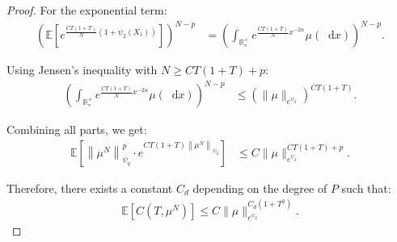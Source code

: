 \documentclass[11pt,a4paper]{article}
\newcommand{\RR}{\mathbb{R}}
\newcommand{\RRP}{\mathbb{R}^+_*}
\newcommand{\red}[1]{\textcolor{red}{#1}}
\newcommand{\E}[1]{\mathbb{E}\left[#1\right]}
\newcommand{\dd}{\mathop{}\!\mathrm{d}}
\newtheorem{lemma}[theorem]{Lemma}
\begin{document}
\begin{proof}
    For the exponential term:
    \begin{align*}
        \left(\E{e^{\frac{C T(1 + T)}{N}(1 + \psi_2(X_1))}}\right)^{N-p} 
        &= \left(\int_{\RRP} e^{\frac{C T(1 + T)}{N} x^{-2\alpha}} \mu(\dd x) \right)^{N - p}.
    \end{align*}

    Using Jensen’s inequality with $N \geq C T(1 + T) + p$:
    \begin{align*}
        \left(\int_{\RRP} e^{\frac{C T(1 + T)}{N} x^{-2\alpha}} \mu(\dd x)\right)^{N - p} 
        &\leq \left(\|\mu\|_{e^{\psi_2}}\right)^{C T(1 + T)}.
    \end{align*}

    Combining all parts, we get:
    \begin{align*}
        \E{\left\|\mu^N\right\|_{\psi_q}^p \cdot e^{C T(1 + T)\left\|\mu^N\right\|_{\psi_2}}} 
        &\leq C \|\mu\|_{e^{\psi_2}}^{C T(1 + T) + p}.
    \end{align*}

    Therefore, there exists a constant $C_d$ depending on the degree of $P$ such that:
    \begin{align*}
        \E{C(T,\mu^N)} \leq C \|\mu\|_{e^{\psi_2}}^{C_d(1 + T^2)}.
    \end{align*}
\end{proof}




\appendix

    
\end{document}
